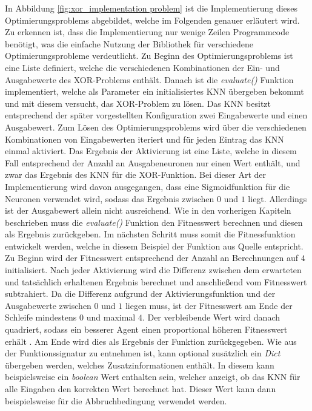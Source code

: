 In Abbildung \ref{fig:xor_implementation problem} ist die Implementierung dieses Optimierungsproblems abgebildet, welche im Folgenden genauer erläutert wird. Zu erkennen ist, dass die Implementierung nur wenige Zeilen Programmcode benötigt, was die einfache Nutzung der Bibliothek für verschiedene Optimierungsprobleme verdeutlicht. Zu Beginn des Optimierungsproblems ist eine Liste definiert, welche die verschiedenen Kombinationen der Ein- und Ausgabewerte des XOR-Problems enthält. Danach ist die \emph{evaluate()} Funktion implementiert, welche als Parameter ein initialisiertes \ac{KNN} übergeben bekommt und mit diesem versucht, das XOR-Problem zu lösen. Das \ac{KNN} besitzt entsprechend der später vorgestellten Konfiguration zwei Eingabewerte und einen Ausgabewert. Zum Lösen des Optimierungsproblems wird über die verschiedenen Kombinationen von Eingabewerten iteriert und für jeden Eintrag das \ac{KNN} einmal aktiviert. Das Ergebnis der Aktivierung ist eine Liste, welche in diesem Fall entsprechend der Anzahl an Ausgabeneuronen nur einen Wert enthält, und zwar das Ergebnis des \ac{KNN} für die XOR-Funktion. Bei dieser Art der Implementierung wird davon ausgegangen, dass eine Sigmoidfunktion für die Neuronen verwendet wird, sodass das Ergebnis zwischen $0$ und $1$ liegt. Allerdings ist der Ausgabewert allein nicht ausreichend. Wie in den vorherigen Kapiteln beschrieben muss die \emph{evaluate()} Funktion den Fitnesswert berechnen und diesen als Ergebnis zurückgeben. Im nächsten Schritt muss somit die Fitnessfunktion entwickelt werden, welche in diesem Beispiel der Funktion aus Quelle \cite{stanley2002evolving} entspricht. Zu Beginn wird der Fitnesswert entsprechend der Anzahl an Berechnungen auf $4$ initialisiert. Nach jeder Aktivierung wird die Differenz zwischen dem erwarteten und tatsächlich erhaltenen Ergebnis berechnet und anschließend vom Fitnesswert subtrahiert. Da die Differenz aufgrund der Aktivierungsfunktion und der Ausgabewerte zwischen $0$ und $1$ liegen muss, ist der Fitnesswert am Ende der Schleife mindestens $0$ und maximal $4$. Der verbleibende Wert wird danach quadriert, sodass ein besserer Agent einen proportional höheren Fitnesswert erhält \cite{stanley2002evolving}. Am Ende wird dies als Ergebnis der Funktion zurückgegeben. Wie aus der Funktionssignatur zu entnehmen ist, kann optional zusätzlich ein \emph{Dict} übergeben werden, welches Zusatzinformationen enthält. In diesem kann beispielsweise ein \emph{boolean} Wert enthalten sein, welcher anzeigt, ob das \ac{KNN} für alle Eingaben den korrekten Wert berechnet hat. Dieser Wert kann dann beispielsweise für die Abbruchbedingung verwendet werden.


